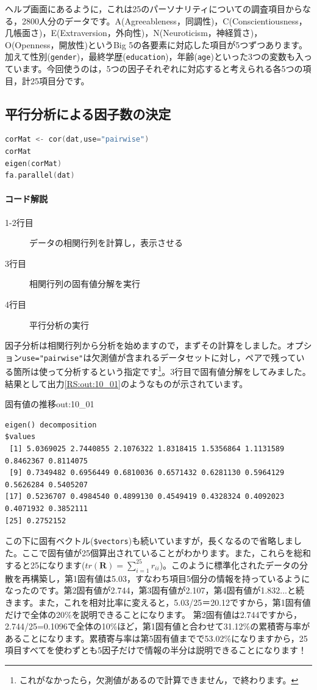 \documentclass{ltjsbook}
\begin{document}
ヘルプ画面にあるように，これは25のパーソナリティについての調査項目からなる，2800人分のデータです。A(Agreeableness，同調性)，C(Conscientiousness，几帳面さ)，E(Extraversion，外向性)，N(Neuroticism，神経質さ)，O(Openness，開放性)というBig 5の各要素に対応した項目が5つずつあります。加えて性別(\texttt{gender})，最終学歴(\texttt{education})，年齢(\texttt{age})といった3つの変数も入っています。今回使うのは，5つの因子それぞれに対応すると考えられる各5つの項目，計25項目分です。

\subsection{平行分析による因子数の決定}
\begin{lstlisting}[language=c++,label={code:10_02},caption={データの構造を見る}]
corMat <- cor(dat,use="pairwise") 
corMat
eigen(corMat)
fa.parallel(dat)
\end{lstlisting}
\paragraph{コード解説}
\begin{description}
	\item[1-2行目] データの相関行列を計算し，表示させる
	\item[3行目] 相関行列の固有値分解を実行
	\item[4行目] 平行分析の実行
\end{description}

因子分析は相関行列から分析を始めますので，まずその計算をしました。オプション\texttt{use="pairwise"}は欠測値が含まれるデータセットに対し，ペアで残っている箇所は使って分析するという指定です\footnote{これがなかったら，欠測値があるので計算できません，で終わります。}。3行目で固有値分解をしてみました。結果として出力\ref{RS:out:10_01}のようなものが示されています。

\begin{Rscreen}{固有値の推移}{out:10_01}
	\begin{verbatim}
eigen() decomposition
$values
 [1] 5.0369025 2.7440855 2.1076322 1.8318415 1.5356864 1.1131589 0.8462367 0.8114075
 [9] 0.7349482 0.6956449 0.6810036 0.6571432 0.6281130 0.5964129 0.5626284 0.5405207
[17] 0.5236707 0.4984540 0.4899130 0.4549419 0.4328324 0.4092023 0.4071932 0.3852111
[25] 0.2752152
\end{verbatim}
\end{Rscreen}

この下に固有ベクトル(\verb|$vectors|)も続いていますが，長くなるので省略しました。ここで固有値が25個算出されていることがわかります。また，これらを総和すると25になります($tr(\bm{R})=\sum_{i=1}^{25} r_{ii}$)。このように標準化されたデータの分散を再構築し，第1固有値は5.03，すなわち項目5個分の情報を持っているようになったのです。第2固有値が2.744，第3固有値が2.107，第4固有値が1.832...と続きます。また，これを相対比率に変えると，5.03/25＝20.12ですから，第1固有値だけで全体の20\%を説明できることになります。
第2固有値は2.744ですから，2.744/25=0.1096で全体の10\%ほど，第1固有値と合わせて31.12\%の累積寄与率があることになります。累積寄与率は第5固有値までで53.02\%になりますから，25項目すべてを使わずとも5因子だけで情報の半分は説明できることになります！
\end{document}
